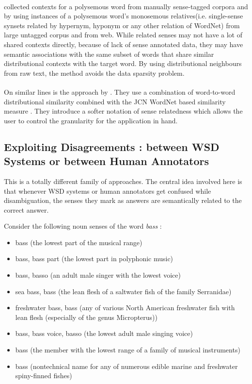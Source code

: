 \paragraph{}
\citep{agirre2003clustering} collected contexts for a polysemous word from manually sense-tagged corpora and by using instances of a polysemous word's monosemous relatives(i.e. single-sense synsets related by hypernym, hyponym or any other relation of WordNet) from large untagged corpus and from web. While related senses may not have a lot of shared contexts directly, because of lack of sense annotated data, they may have semantic associations with the same subset of words that share similar distributional contexts with the target word. By using distributional neighbours from raw text, the method avoids the data sparsity problem.

\paragraph{}
On similar lines is the approach by \citep{mccarthy2006relating}. They use a combination of word-to-word distributional similarity combined with the JCN WordNet based similarity measure \citep{JCN:1997}. They introduce a softer notation of sense relatedness which allows the user to control the granularity for the application in hand.

\subsection{Exploiting Disagreements : between WSD Systems or between Human Annotators}
This is a totally different family of approaches. 
The central idea involved here is that whenever WSD systems or human annotators get confused while disambiguation, the senses they mark as answers are semantically related to the correct answer.
\begin{example}
Consider the following noun senses of the word \textit{bass} :
\begin{itemize}
\item bass (the lowest part of the musical range)
\item bass, bass part (the lowest part in polyphonic music)
\item bass, basso (an adult male singer with the lowest voice)
\item sea bass, bass (the lean flesh of a saltwater fish of the family Serranidae)
\item freshwater bass, bass (any of various North American freshwater fish with lean flesh (especially of the genus Micropterus))
\item bass, bass voice, basso (the lowest adult male singing voice)
\item bass (the member with the lowest range of a family of musical instruments)
\item bass (nontechnical name for any of numerous edible marine and freshwater spiny-finned fishes)
\end{itemize}
\end{example}

